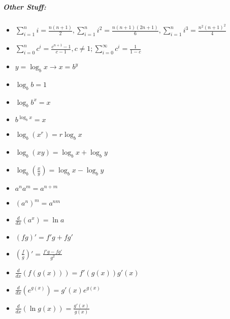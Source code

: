 \documentclass{article}
\begin{document}
\subparagraph*{Other Stuff:}
\begin{itemize}
    \item[] \(\sum\limits_{i=1}^{n}i = \frac{n(n+1)}{2},\sum\limits_{i=1}^{n}i^2 = \frac{n(n+1)(2n+1)}{6}, \sum\limits_{i=1}^{n} i^3 = \frac{n^2(n+1)^2}{4}\)
    \item[] \(\sum\limits_{i=0}^{n}c^i = \frac{c^{n+1}-1}{c-1}, c \neq 1; \sum\limits_{i=0}^{\infty}c^i = \frac{1}{1-c}\)
    \item[] \(y = \log_bx \rightarrow x = b^y\)
    \item[] \(\log_bb = 1\)
    \item[] \(\log_bb^x = x\)
    \item[] \(b^{\log_bx}=x\)
    \item[] \(\log_b(x^r)=r\log_bx\)
    \item[] \(\log_b(xy) = \log_bx+\log_by\)
    \item[] \(\log_b\left(\frac{x}{y}\right)=\log_bx-\log_by\)
    \item[] \(a^n a^m = a^{n+m}\)
    \item[] \((a^n)^m = a^{nm}\)
    \item[] \(\frac{d}{dx}(a^x) = \ln a\)
    \item[] \((fg)' = f'g + fg'\)
    \item[] \(\left(\frac{f}{g}\right)' = \frac{f'g-fg'}{g^2}\)
    \item[] \(\frac{d}{dx}(f(g(x)))=f'(g(x))g'(x)\)
    \item[] \(\frac{d}{dx}(e^{g(x)})= g'(x)e^{g(x)}\)
    \item[] \(\frac{d}{dx}(\ln g(x)) = \frac{g'(x)}{g(x)}\)
\end{itemize}
\end{document}

